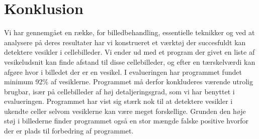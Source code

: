 \thispagestyle{plain}
\section{Konklusion}
\pagestyle{headings}

Vi har gennemgået en række, for billedbehandling, essentielle teknikker og ved at analysere på deres resultater har vi konstrueret et værktøj der succesfuldt kan detektere vesikler i cellebilleder. Vi ender ud med et program der givet en liste af vesikeludsnit kan finde afstand til disse cellebilleder, og efter en tærskelværdi kan afgøre hvor i billedet der er en vesikel. I evalueringen har programmet fundet minimum 92\% af vesiklerne. Programmet må derfor konkluderes værende utrolig brugbar, især på cellebilleder af høj detaljeringsgrad, som vi har benyttet i evalueringen. Programmet har vist sig stærk nok til at detektere vesikler i ukendte celler selvom vesiklerne kan være meget forskellige. Grunden den høje støj i billederne finder programmet også en stor mængde falske positive hvorfor der er plads til forbedring af programmet.